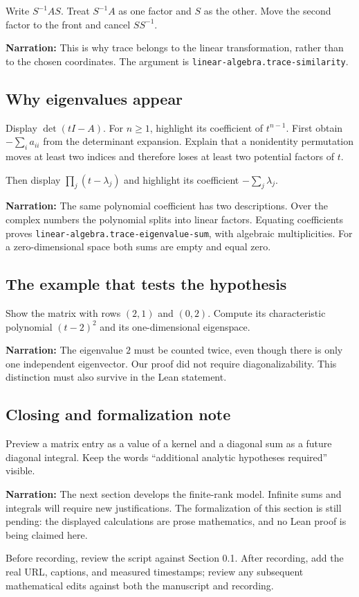 Write $S^{-1}AS$. Treat $S^{-1}A$ as one factor and $S$ as the other. Move the second factor to the front and cancel $SS^{-1}$.

\textbf{Narration:} This is why trace belongs to the linear transformation, rather than to the chosen coordinates. The argument is \texttt{linear-algebra.trace-similarity}.

\subsection{Why eigenvalues appear}\label{why-eigenvalues-appear}

Display $\det(tI-A)$. For $n\geq1$, highlight its coefficient of $t^{n-1}$. First obtain $-\sum_i a_{ii}$ from the determinant expansion. Explain that a nonidentity permutation moves at least two indices and therefore loses at least two potential factors of $t$.

Then display $\prod_j(t-\lambda_j)$ and highlight its coefficient $-\sum_j\lambda_j$.

\textbf{Narration:} The same polynomial coefficient has two descriptions. Over the complex numbers the polynomial splits into linear factors. Equating coefficients proves \texttt{linear-algebra.trace-eigenvalue-sum}, with algebraic multiplicities. For a zero-dimensional space both sums are empty and equal zero.

\subsection{The example that tests the hypothesis}\label{the-example-that-tests-the-hypothesis}

Show the matrix with rows $(2,1)$ and $(0,2)$. Compute its characteristic polynomial $(t-2)^2$ and its one-dimensional eigenspace.

\textbf{Narration:} The eigenvalue $2$ must be counted twice, even though there is only one independent eigenvector. Our proof did not require diagonalizability. This distinction must also survive in the Lean statement.

\subsection{Closing and formalization note}\label{closing-and-formalization-note}

Preview a matrix entry as a value of a kernel and a diagonal sum as a future diagonal integral. Keep the words ``additional analytic hypotheses required'' visible.

\textbf{Narration:} The next section develops the finite-rank model. Infinite sums and integrals will require new justifications. The formalization of this section is still pending: the displayed calculations are prose mathematics, and no Lean proof is being claimed here.

Before recording, review the script against Section 0.1. After recording, add the real URL, captions, and measured timestamps; review any subsequent mathematical edits against both the manuscript and recording.
